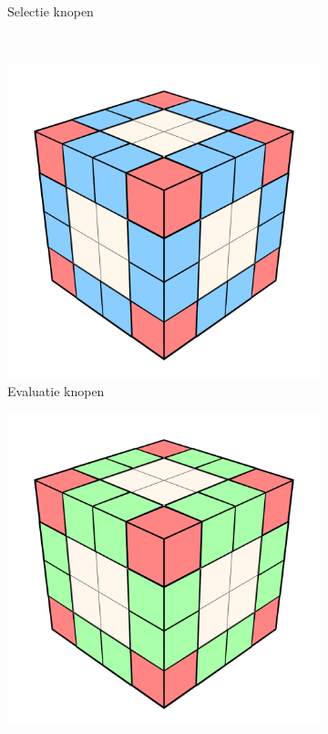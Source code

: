 \begin{figure}[p]
\begin{subfigure}[b]{.3\linewidth}
    \caption{Selectie knopen}%
    \label{fig:hs-p1f}%
  \end{subfigure}
  \\
  \begin{subfigure}[b]{.3\linewidth}
    \includegraphics[width=\textwidth]{./img/raw/hs-slt-algorithm/hs-slt-algorithm-7.png}%
    \caption{Evaluatie knopen}%
    \label{fig:hs-p1g}%
  \end{subfigure}
  \begin{subfigure}[b]{.3\linewidth}
    \includegraphics[width=\textwidth]{./img/raw/hs-slt-algorithm/hs-slt-algorithm-8.png}%

\end{subfigure}
\end{figure}
